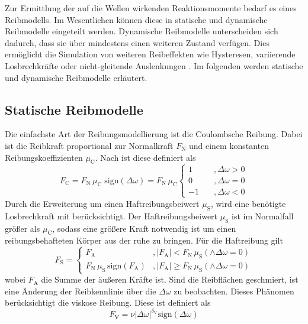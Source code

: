 Zur Ermittlung der auf die Wellen wirkenden Reaktionsmomente bedarf es eines Reibmodells. Im Wesentlichen können diese in statische und dynamische Reibmodelle eingeteilt werden. Dynamische Reibmodelle unterscheiden sich dadurch, dass sie über mindestens einen weiteren Zustand verfügen. Dies ermöglicht die Simulation von weiteren Reibeffekten wie Hysteresen, variierende Losbrechkräfte oder nicht-gleitende Auslenkungen \cite{Schroeder.2015}. Im folgenden werden statische und dynamische Reibmodelle erläutert.

\subsection{Statische Reibmodelle}
Die einfachste Art der Reibungsmodellierung ist die Coulombsche Reibung. Dabei ist die Reibkraft proportional zur Normalkraft $F_\mathrm{N}$ und einem konstanten Reibungskoeffizienten $\mu_\mathrm{C}$. Nach \cite{Schroeder.2015} ist diese definiert als
\begin{equation}
F_\mathrm{C} = F_\mathrm{N}\,\mu_\mathrm{C}\;\mathrm{sign}(\Delta \omega)=F_\mathrm{N}\,\mu_\mathrm{C}\begin{cases}1&\quad,\Delta \omega>0\\0&\quad,\Delta \omega=0\\-1&\quad,\Delta \omega<0 \end{cases}
\end{equation}
Durch die Erweiterung um einen Haftreibungsbeiwert $\mu_\mathrm{S}$, wird eine benötigte Losbrechkraft mit berücksichtigt. Der Haftreibungsbeiwert $\mu_\mathrm{S}$ ist im Normalfall größer als $\mu_\mathrm{C}$, sodass eine größere Kraft notwendig ist um einen reibungsbehafteten Körper aus der ruhe zu bringen. Für die Haftreibung gilt
\begin{equation}
F_\mathrm{S} = \begin{cases}F_\mathrm{A}&,\vert F_\mathrm{A}\vert < F_\mathrm{N}\,\mu_\mathrm{S} (\wedge\Delta \omega = 0)
\\ F_\mathrm{N}\,\mu_\mathrm{S}\,\mathrm{sign}(F_\mathrm{A})&,\vert F_\mathrm{A}\vert \geq F_\mathrm{N}\,\mu_\mathrm{S} (\wedge\Delta \omega = 0) \end{cases}
\end{equation}
wobei $F_\mathrm{A}$ die Summe der äußeren Kräfte ist. Sind die Reibflächen geschmiert, ist eine Änderung der Reibkennlinie über  die $\Delta \omega$ zu beobachten. Dieses Phänomen berücksichtigt die viskose Reibung. Diese ist definiert als
\begin{equation}
F_\mathrm{V}=\nu\vert\Delta\omega\vert^{\delta_\mathrm{V}}\mathrm{sign}(\Delta\omega)
\end{equation}
